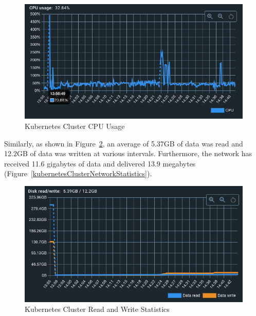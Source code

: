 \documentclass[preprint,12pt]{elsarticle}
\begin{document}
\begin{figure}[h!]
  \centering
  \includegraphics[width=\textwidth]{images/kubernetes-cluster-CPU-usage.png}
  \caption{Kubernetes Cluster CPU Usage}
  \label{kubernetesClusterCpuUsage}
\end{figure}

Similarly, as shown in Figure~\ref{kubernetesClusterReadAndWrite}, an average of 5.37GB of data was read and 12.2GB of data was written at various intervals. Furthermore, the network has received 11.6 gigabytes of data and delivered 13.9 megabytes (Figure~\ref{kubernetesClusterNetworkStatistics}).

\begin{figure}[h!]
  \centering
  \includegraphics[width=\textwidth]{images/Kubernetes-cluster-data-read-write.png}
  \caption{Kubernetes Cluster Read and Write Statistics}
  \label{kubernetesClusterReadAndWrite}
\end{figure}
\end{document}
